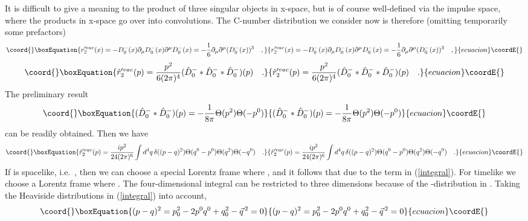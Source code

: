 \documentclass[a4paper,11pt]{article}
\begin{document}
It is difficult to give a meaning to the product of three singular objects
in x-space, but \coordHE{} is of course well-defined via the impulse space,
where the products in x-space go over into convolutions.
The C-number distribution we consider now is therefore
(omitting temporarily some prefactors)
\begin{equation}\coord{}\boxEquation{
r'^{vac}_2(x)=-D_0^-(x) \partial_\mu D_0^-(x) \partial^\mu D_0^-(x)=
-\frac{1}{6} \partial_\mu \partial^\mu (D_0^{-}(x))^3 \quad ,
}{
r'^{vac}_2(x)=-D_0^-(x) \partial_\mu D_0^-(x) \partial^\mu D_0^-(x)=
-\frac{1}{6} \partial_\mu \partial^\mu (D_0^{-}(x))^3 \quad ,
}{ecuacion}\coordE{}\end{equation}
\begin{equation}\coord{}\boxEquation{
\hat{r}'^{vac}_2(p)=\frac{p^2}{6(2 \pi)^4} (\hat{D}^-_0 \ast \hat{D}^-_0
\ast \hat{D}^-_0)(p) \quad .
}{
\hat{r}'^{vac}_2(p)=\frac{p^2}{6(2 \pi)^4} (\hat{D}^-_0 \ast \hat{D}^-_0
\ast \hat{D}^-_0)(p) \quad .
}{ecuacion}\coordE{}\end{equation}
The preliminary result
\begin{equation}\coord{}\boxEquation{
 (\hat{D}^-_0 \ast \hat{D}^-_0)(p)=-\frac{1}{8 \pi} \Theta(p^2) \Theta(-p^0)
}{
 (\hat{D}^-_0 \ast \hat{D}^-_0)(p)=-\frac{1}{8 \pi} \Theta(p^2) \Theta(-p^0)
}{ecuacion}\coordE{}\end{equation}
can be readily obtained. Then we have
\begin{equation}\coord{}\boxEquation{
\hat{r}'^{vac}_2(p)=\frac{i p^2}{24(2 \pi)^6} \int d^4q \, \delta((p-q)^2)
\Theta(q^0-p^0) \Theta(q^2) \Theta(-q^0) \quad . \label{integral}
}{
\hat{r}'^{vac}_2(p)=\frac{i p^2}{24(2 \pi)^6} \int d^4q \, \delta((p-q)^2)
\Theta(q^0-p^0) \Theta(q^2) \Theta(-q^0) \quad . }{ecuacion}\coordE{}\end{equation}
If \coordHE{} is spacelike, i.e.\ \coordHE{}, then we can choose a special Lorentz frame
where \coordHE{}, and it follows that
\coordHE{} due to the term
\coordHE{} in (\ref{integral}).
For timelike \coordHE{} we choose a Lorentz frame where \coordHE{}.
The four-dimensional integral can be restricted to three dimensions
because of the \myHighlight{$\delta$}\coordHE{}-distribution in \coordHE{}.
Taking the Heaviside distributions in (\ref{integral}) into account,
\begin{equation}\coord{}\boxEquation{
(p-q)^2=p_0^2-2p^0q^0+q_0^2-\vec{q}^{\,2}=0
}{
(p-q)^2=p_0^2-2p^0q^0+q_0^2-\vec{q}^{\,2}=0
}{ecuacion}\coordE{}\end{equation}
\end{document}
